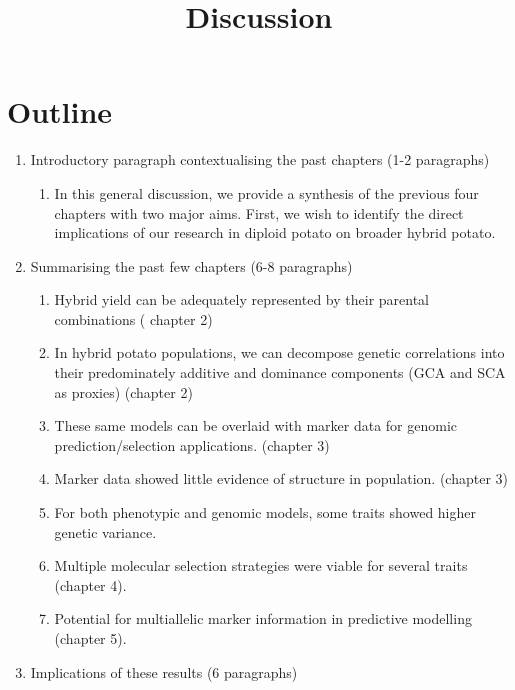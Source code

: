 \documentclass[
]{article}
\title{Discussion}
\author{}
\date{}
\providecommand{\tightlist}{%
  \setlength{\itemsep}{0pt}\setlength{\parskip}{0pt}}\usepackage{longtable,booktabs,array}
\begin{document}
\maketitle


\section{Outline}\label{outline}

\begin{enumerate}
\def\labelenumi{\arabic{enumi}.}
\tightlist
\item
  Introductory paragraph contextualising the past chapters (1-2
  paragraphs)

  \begin{enumerate}
  \def\labelenumii{\roman{enumii})}
  \tightlist
  \item
    In this general discussion, we provide a synthesis of the previous
    four chapters with two major aims. First, we wish to identify the
    direct implications of our research in diploid potato on broader
    hybrid potato.
  \end{enumerate}
\item
  Summarising the past few chapters (6-8 paragraphs)

  \begin{enumerate}
  \def\labelenumii{\roman{enumii})}
  \tightlist
  \item
    Hybrid yield can be adequately represented by their parental
    combinations ( chapter 2)
  \item
    In hybrid potato populations, we can decompose genetic correlations
    into their predominately additive and dominance components (GCA and
    SCA as proxies) (chapter 2)
  \item
    These same models can be overlaid with marker data for genomic
    prediction/selection applications. (chapter 3)
  \item
    Marker data showed little evidence of structure in population.
    (chapter 3)
  \item
    For both phenotypic and genomic models, some traits showed higher
    genetic variance.
  \item
    Multiple molecular selection strategies were viable for several
    traits (chapter 4).
  \item
    Potential for multiallelic marker information in predictive
    modelling (chapter 5).
  \end{enumerate}
\item
  Implications of these results (6 paragraphs)


\end{enumerate}
\end{document}
